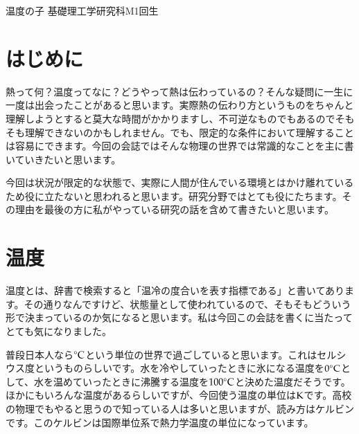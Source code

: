 \documentclass[10pt,b5paper,papersize,dvipdfmx]{jsbook}
\begin{document}


\kaishititle%
  {温度の子}%
  {基礎理工学研究科M1回生}%
  {}%


\section*{はじめに}
熱って何？温度ってなに？どうやって熱は伝わっているの？そんな疑問に一生に一度は出会ったことがあると思います。実際熱の伝わり方というものをちゃんと理解しようとすると莫大な時間がかかりますし、不可逆なものでもあるのでそもそも理解できないのかもしれません。でも、限定的な条件において理解することは容易にできます。今回の会誌ではそんな物理の世界では常識的なことを主に書いていきたいと思います。\par
今回は状況が限定的な状態で、実際に人間が住んでいる環境とはかけ離れているため役に立たないと思われると思います。研究分野ではとても役にたちます。その理由を最後の方に私がやっている研究の話を含めて書きたいと思います。


%
\section{温度}
温度とは、辞書で検索すると「温冷の度合いを表す指標である」と書いてあります。その通りなんですけど、状態量として使われているので、そもそもどういう形で決まっているのか気になると思います。私は今回この会誌を書くに当たってとても気になりました。\par 
普段日本人なら$^\circ \rm{C}$という単位の世界で過ごしていると思います。これはセルシウス度というものらしいです。水を冷やしていったときに氷になる温度を$0 ^\circ \rm{C}$として、水を温めていったときに沸騰する温度を$100 ^\circ \rm{C}$と決めた温度だそうです。ほかにもいろんな温度があるらしいですが、今回使う温度の単位は$\rm{K}$です。高校の物理でもやると思うので知っている人は多いと思いますが、読み方はケルビンです。このケルビンは国際単位系で熱力学温度の単位になっています。\par
\end{document}
